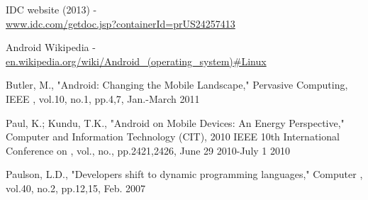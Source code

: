 \documentclass{sigplanconf}
\def \ANDROID{\mbox{Android}\xspace}
\begin{document}
\begin{thebibliography}{}
  \softraggedright

  IDC website (2013) - \\ \url{www.idc.com/getdoc.jsp?containerId=prUS24257413}

  \ANDROID Wikipedia - \\ \url{en.wikipedia.org/wiki/Android_(operating_system)#Linux}

   Butler, M., "Android: Changing the Mobile Landscape," Pervasive Computing, IEEE , vol.10, no.1, pp.4,7, Jan.-March 2011

  Paul, K.; Kundu, T.K., "Android on Mobile Devices: An Energy Perspective," Computer and Information Technology (CIT), 2010 IEEE 10th International Conference on , vol., no., pp.2421,2426, June 29 2010-July 1 2010

  Paulson, L.D., "Developers shift to dynamic programming languages," Computer , vol.40, no.2, pp.12,15, Feb. 2007


\end{thebibliography}
\end{document}

